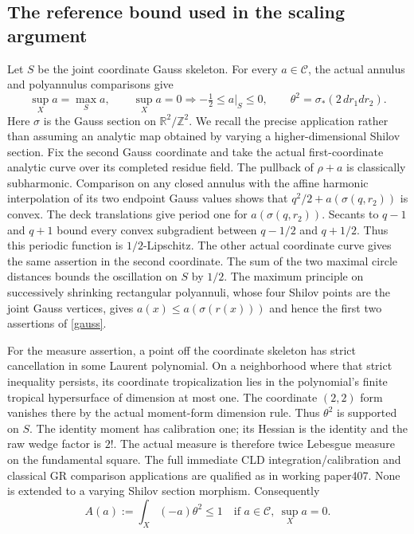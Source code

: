 \documentclass[11pt]{article}
\newcommand{\C}{\mathcal C}
\newcommand{\R}{\mathbb R}
\begin{document}
\subsection{The reference bound used in the scaling argument}
Let $S$ be the joint coordinate Gauss skeleton. For every $a\in\C$,
the actual annulus and polyannulus comparisons give
\begin{equation}\label{gauss}
 \sup_Xa=\max_S a,\qquad
 \sup_Xa=0\Longrightarrow -\tfrac12\le a|_S\le0,
 \qquad \theta^2=\sigma_*(2\,dr_1dr_2).
\end{equation}
Here $\sigma$ is the Gauss section on $\R^2/\mathbb Z^2$.
We recall the precise application rather than assuming an analytic map
obtained by varying a higher-dimensional Shilov section. Fix the second
Gauss coordinate and take the actual first-coordinate analytic curve
over its completed residue field. The pullback of $\rho+a$ is
classically subharmonic. Comparison on any closed annulus with the
affine harmonic interpolation of its two endpoint Gauss values shows
that $q^2/2+a(\sigma(q,r_2))$ is convex. The deck translations give
period one for $a(\sigma(q,r_2))$. Secants to $q-1$ and $q+1$ bound
every convex subgradient between $q-1/2$ and $q+1/2$. Thus this periodic
function is $1/2$-Lipschitz. The other actual coordinate curve gives
the same assertion in the second coordinate. The sum of the two maximal
circle distances bounds the oscillation on $S$ by $1/2$.
The maximum principle on successively shrinking rectangular polyannuli,
whose four Shilov points are the joint Gauss vertices, gives
$a(x)\le a(\sigma(r(x)))$ and hence the first two assertions of
\eqref{gauss}.

For the measure assertion, a point off the coordinate skeleton has
strict cancellation in some Laurent polynomial. On a neighborhood
where that strict inequality persists, its coordinate tropicalization
lies in the polynomial's finite tropical hypersurface of dimension at
most one. The coordinate $(2,2)$ form vanishes there by the actual
moment-form dimension rule. Thus $\theta^2$ is supported on $S$.
The identity moment has calibration one; its Hessian is the identity
and the raw wedge factor is $2!$. The actual measure is therefore
twice Lebesgue measure on the fundamental square. The full immediate
CLD integration/calibration and classical GR comparison applications
are qualified as in working paper407. None is extended to a varying
Shilov section morphism. Consequently
\begin{equation}\label{A}
 A(a):=\int_X(-a)\theta^2\le1
 \quad\text{if }a\in\C,\ \sup_Xa=0.
\end{equation}
\end{document}
